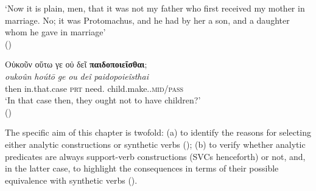 \documentclass[output=paper,colorlinks,citecolor=brown]{langscibook}
\begin{document}
\glt `Now it is plain, men, that it was not my father who first received my mother in marriage. No; it was Protomachus, and he had by her a son, and a daughter whom he gave in marriage' \\
\hspace*{\fill}()
\z

\ea \label{ex:2}
\glll Οὐκοῦν	οὕτω		γε	οὐ	δεῖ		\textbf{παιδοποιεῖσθαι};\\
	\textit{oukoûn}	\textit{hoútō}		\textit{ge}	\textit{ou}	\textit{deî}		\textit{paidopoieîsthai}	\\
	then	in.that.case	\textsc{prt}	\Neg{}	need.\Tsg{}	child.make.\Inf{}.\textsc{mid/pass}	\\
\glt `In that case then, they ought not to have children?' \\
\hspace*{\fill}()
\z

The specific aim of this chapter is twofold: (a) to identify the reasons for selecting either analytic constructions or synthetic verbs (); (b) to verify whether analytic predicates are always support-verb constructions (SVCs henceforth) or not, and, in the latter case, to highlight the consequences in terms of their possible equivalence with synthetic verbs ().
\end{document}
